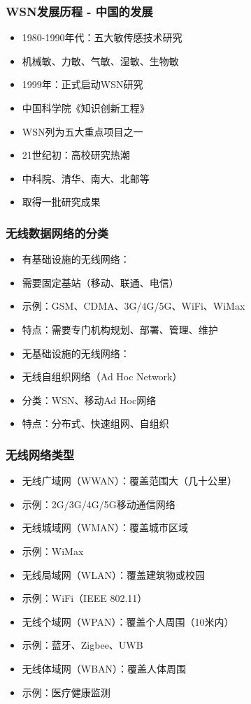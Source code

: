 \documentclass[aspectratio=43]{beamer}
\begin{document}
\begin{frame}
  \frametitle{WSN发展历程 - 中国的发展}

  \begin{itemize}
  \item<+-> 1980-1990年代：五大敏传感技术研究
  \item<+-> 机械敏、力敏、气敏、湿敏、生物敏
  \item<+-> 1999年：正式启动WSN研究
  \item<+-> 中国科学院《知识创新工程》
  \item<+-> WSN列为五大重点项目之一
  \item<+-> 21世纪初：高校研究热潮
  \item<+-> 中科院、清华、南大、北邮等
  \item<+-> 取得一批研究成果
  \end{itemize}
\end{frame}

\begin{frame}
  \frametitle{无线数据网络的分类}

  \begin{itemize}
  \item<+-> 有基础设施的无线网络：
  \item<+-> 需要固定基站（移动、联通、电信）
  \item<+-> 示例：GSM、CDMA、3G/4G/5G、WiFi、WiMax
  \item<+-> 特点：需要专门机构规划、部署、管理、维护
  \item<+-> 无基础设施的无线网络：
  \item<+-> 无线自组织网络（Ad Hoc Network）
  \item<+-> 分类：WSN、移动Ad Hoc网络
  \item<+-> 特点：分布式、快速组网、自组织
  \end{itemize}
\end{frame}

\begin{frame}
  \frametitle{无线网络类型}

  \begin{itemize}
  \item<+-> 无线广域网（WWAN）：覆盖范围大（几十公里）
  \item<+-> 示例：2G/3G/4G/5G移动通信网络
  \item<+-> 无线城域网（WMAN）：覆盖城市区域
  \item<+-> 示例：WiMax
  \item<+-> 无线局域网（WLAN）：覆盖建筑物或校园
  \item<+-> 示例：WiFi（IEEE 802.11）
  \item<+-> 无线个域网（WPAN）：覆盖个人周围（10米内）
  \item<+-> 示例：蓝牙、Zigbee、UWB
  \item<+-> 无线体域网（WBAN）：覆盖人体周围
  \item<+-> 示例：医疗健康监测
  \end{itemize}
\end{frame}
\end{document}
